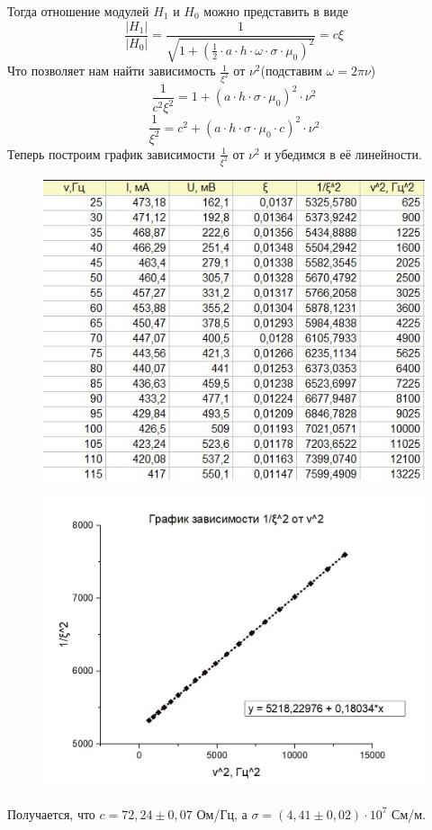 \documentclass[a4paper,12pt]{article}
\begin{document}
Тогда отношение модулей $H_1$ и $H_0$ можно представить в виде
\[\frac{|H_1|}{|H_0|} = \frac{1}{\sqrt{1+(\frac{1}{2} \cdot a \cdot h \cdot \omega \cdot \sigma \cdot \mu_0)^2}} = c \xi\]
Что позволяет нам найти зависимость $\frac{1}{\xi^2}$ от $\nu^2$(подставим $\omega = 2 \pi \nu$)
\[\frac{1}{c^2\xi^2} = 1 + (a \cdot h \cdot \sigma \cdot \mu_0)^2 \cdot \nu^2\]
\[\frac{1}{\xi^2} = c^2 + (a \cdot h \cdot \sigma \cdot \mu_0 \cdot c)^2 \cdot \nu^2\]
Теперь построим график зависимости $\frac{1}{\xi^2}$ от $\nu^2$ и убедимся в её линейности.
\begin{figure}[H]
	\begin{center}
    \includegraphics[width=.75\textwidth]{tabliza1.jpg}
	\end{center}
\end{figure}
\begin{figure}[H]
	\begin{center}
    \includegraphics[width=1\textwidth]{graphik1.jpg}
	\end{center}
\end{figure}
Получается, что $c = 72,24 \pm 0,07$ Ом/Гц, а $\sigma = (4,41 \pm 0,02) \cdot 10^7$ См/м.
\end{document}
